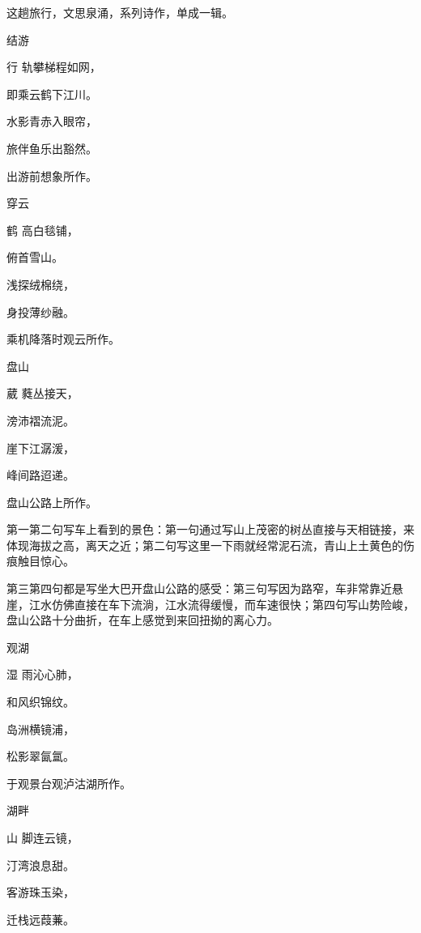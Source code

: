 \documentclass{article}
\newenvironment{poem}[3]{
\begin{minipage}{\textwidth}
\begin{pinyinscope}\begin{center}\Large\linespread{1.4}\selectfont #2\end{center}\end{pinyinscope}
\begin{pinyinscope}
	\begin{center}
	\Large\linespread{1.4}\rmfamily\selectfont #3
}{\end{center}
\end{pinyinscope}
\end{minipage}
}
\begin{document}
这趟旅行，文思泉涌，系列诗作，单成一辑。

\begin{poem}{}{结游}
行轨攀梯程如网，

即乘云鹤下江川。

水影青赤入眼帘，

旅伴鱼乐出豁然。
\end{poem}

出游前想象所作。

\bigbreak

\begin{poem}{}{穿云}
鹤高白毯铺，

俯首雪山{}。

浅探绒棉绕，

身投薄纱融。
\end{poem}

乘机降落时观云所作。

\bigbreak

\begin{poem}{}{盘山}
葳蕤丛接天，

滂沛褶流泥。

崖下江潺{\textsf 湲}，

峰间路迢递。
\end{poem}

盘山公路上所作。

第一第二句写车上看到的景色：第一句通过写山上茂密的树丛直接与天相链接，来体现海拔之高，离天之近；第二句写这里一下雨就经常泥石流，青山上土黄色的伤痕触目惊心。

第三第四句都是写坐大巴开盘山公路的感受：第三句写因为路窄，车非常靠近悬崖，江水仿佛直接在车下流淌，江水流得缓慢，而车速很快；第四句写山势险峻，盘山公路十分曲折，在车上感觉到来回扭拗的离心力。

\bigbreak

\begin{poem}{}{观湖}
湿雨沁心肺，

和风织锦纹。

岛洲横镜浦，

松影翠氤氲。
\end{poem}

于观景台观泸沽湖所作。

\bigbreak

\begin{poem}{}{湖畔}
山脚连云镜，

汀湾浪息甜。

客游珠玉染，

迁栈远葭蒹。
\end{poem}
\end{document}
